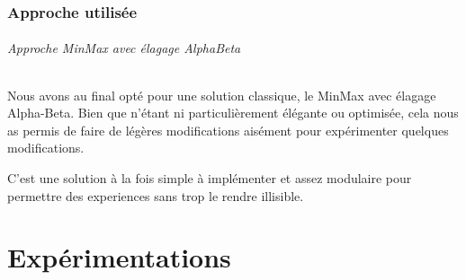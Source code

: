 \documentclass{scrreprt}
\begin{document}
    \section{Approche utilisée}

    \paragraph{Approche MinMax avec élagage AlphaBeta}
    Nous avons au final opté pour une solution classique, le MinMax avec
    élagage Alpha-Beta.
    Bien que n'étant ni particulièrement élégante ou optimisée, cela nous as
    permis de faire de légères modifications aisément pour expérimenter
    quelques modifications.

    \begin{result}
        C'est une solution à la fois simple à implémenter et assez modulaire
        pour permettre des experiences sans trop le rendre illisible.
    \end{result}

    \part{Expérimentations}

    \chapter{}






\end{document}

